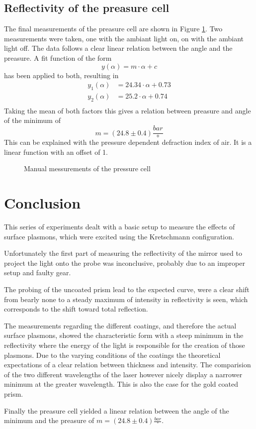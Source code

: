 \documentclass[twoside,english,headsepline=on,DIV=11]{scrartcl}
\numberwithin{equation}{section}
\begin{document}
\subsection{Reflectivity of the preasure cell}
The final measurements of the preasure cell are shown in Figure \ref{fig:preasure}. Two measurements were taken, one with the ambiant light on, on with the ambiant light off. The data follows a clear linear relation between the angle and the preasure. A fit function of the form
\[
y(\alpha) = m\cdot\alpha + c
\]
has been applied to both, resulting in 
\begin{align*}
y_1(\alpha) &= 24.34\cdot\alpha + 0.73 \\
y_2(\alpha) &= 25.2 \cdot\alpha + 0.74 \\
\end{align*}
Taking the mean of both factors this gives a relation between preasure and angle of the minimum of 
\[
m = (24.8\pm 0.4) \frac{\si{bar}}{\si{°}}
\]
This can be explained with the pressure dependent defraction index of air. It is a linear function with an offset of 1.
\begin{figure}
	
	\caption{Manual messurements of the pressure cell}
	\label{fig:preasure}
\end{figure}
\section{Conclusion}
This series of experiments dealt with a basic setup to measure the effects of surface plasmons, which were excited using the Kretschmann configuration. 

Unfortunately the first part of measuring the reflectivity of the mirror used to project the light onto the probe was inconclusive, probably due to an improper setup and faulty gear. 

The probing of the uncoated prism lead to the expected curve, were a clear shift from bearly none to a steady maximum of intensity in reflectivity is seen, which corresponds to the shift toward total reflection.

The measurements regarding the different coatings, and therefore the actual surface plasmons, showed the characteristic form with a steep minimum in the reflectivity where the energy of the light is responsible for the creation of those plasmons. Due to the varying conditions of the coatings the theoretical expectations of a clear relation between thickness and intensity. The comparision of the two different wavelengths of the laser however nicely display a narrower minimum at the greater wavelength. This is also the case for the gold coated prism.

Finally the preasure cell yielded a linear relation between the angle of the minimum and the preasure of $m = (24.8\pm 0.4) \frac{\si{bar}}{\si{°}}$.
\printbibliography
\end{document}
